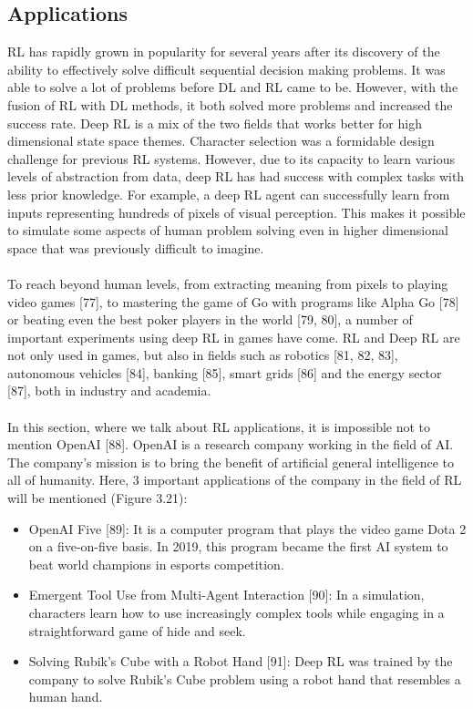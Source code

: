 \documentclass[12pt,twoside,a4]{mwbk}
\begin{document}
\subsection{Applications}
RL has rapidly grown in popularity for several years after its discovery of the ability to effectively solve difficult sequential decision making problems. It was able to solve a lot of problems before DL and RL came to be. However, with the fusion of RL with DL methods, it both solved more problems and increased the success rate. Deep RL is a mix of the two fields that works better for high dimensional state space themes. Character selection was a formidable design challenge for previous RL systems. However, due to its capacity to learn various levels of abstraction from data, deep RL has had success with complex tasks with less prior knowledge. For example, a deep RL agent can successfully learn from inputs representing hundreds of pixels of visual perception. This makes it possible to simulate some aspects of human problem solving even in higher dimensional space that was previously difficult to imagine.
\\ \\
To reach beyond human levels, from extracting meaning from pixels to playing video games [77], to mastering the game of Go with programs like Alpha Go [78] or beating even the best poker players in the world [79, 80], a number of important experiments using deep RL in games have come. RL and Deep RL are not only used in games, but also in fields such as robotics [81, 82, 83], autonomous vehicles [84], banking [85], smart grids [86] and the energy sector [87], both in industry and academia. 
\\ \\
In this section, where we talk about RL applications, it is impossible not to mention OpenAI [88]. OpenAI is a research company working in the field of AI. The company's mission is to bring the benefit of artificial general intelligence to all of humanity. Here, 3 important applications of the company in the field of RL will be mentioned (Figure 3.21):
\begin{itemize}
    \item OpenAI Five [89]: It is a computer program that plays the video game Dota 2 on a five-on-five basis. In 2019, this program became the first AI system to beat world champions in esports competition.
    \item Emergent Tool Use from Multi-Agent Interaction [90]: In a simulation, characters learn how to use increasingly complex tools while engaging in a straightforward game of hide and seek.
    \item Solving Rubik's Cube with a Robot Hand [91]: Deep RL was trained by the company to solve Rubik's Cube problem using a robot hand that resembles a human hand.
\end{itemize}
\end{document}
